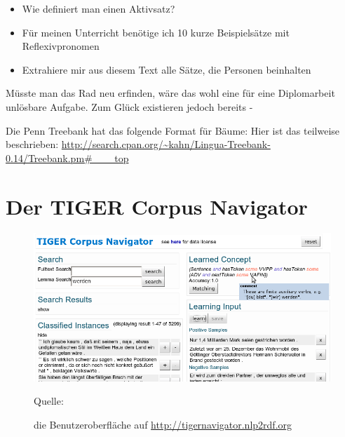 \begin{bsp}
\begin{itemize}
\item Wie definiert man einen Aktivsatz?
\item Für meinen Unterricht benötige ich 10 kurze Beispielsätze mit Reflexivpronomen
\item Extrahiere mir aus diesem Text alle Sätze, die Personen beinhalten
\end{itemize}


Müsste man das Rad neu erfinden, wäre das wohl eine für eine Diplomarbeit unlösbare Aufgabe.
Zum Glück existieren jedoch bereits 
- 
\end{bsp}


Die Penn Treebank hat das folgende Format für Bäume:
Hier ist das teilweise beschrieben:
\url{http://search.cpan.org/~kahn/Lingua-Treebank-0.14/Treebank.pm#___top}
\fi

\section{Der TIGER Corpus Navigator}\label{sec:tiger_corpus_navigator}

\begin{figure}[htb]
\begin{center}
\begin{threeparttable}
\includegraphics[width=\textwidth]{img/tigercorpusnavigator_screenshot.png}
\begin{tablenotes}\footnotesize
 \item [] Quelle: \citet{tiger_corpus_navigator}
\end{tablenotes}
\end{threeparttable}
\caption{die Benutzeroberfläche auf \url{http://tigernavigator.nlp2rdf.org}}
\label{fig:tigercorpusnavigator_screenshot}
\end{center}
\end{figure}

